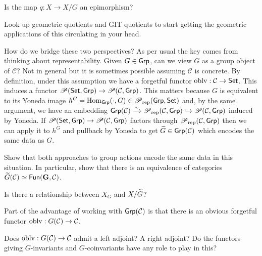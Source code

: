 \documentclass[11pt]{article}
\newcommand{\CC}{\mathcal{C}}
\begin{document}
\begin{exercise}
Is the map $q: X\to X/G$ an epimorphism?
\end{exercise}

\begin{exercise}
Look up geometric quotients and GIT quotients to start getting the geometric applications of this circulating in your head.
\end{exercise}

How do we bridge these two perspectives? As per usual the key comes from thinking about representability. Given $G\in\operatorname{\mathsf{Grp}}$, can we view $G$ as a group object of $\CC$? Not in general but it is sometimes possible assuming $\CC$ is concrete. By definition, under this assumption we have a forgetful functor $\oblv: \CC\to\Set$. This induces a functor $\Pre(\Set,\Grp)\to\Pre(\CC,\Grp)$. This matters because $G$ is equivalent to its Yoneda image $h^G=\operatorname{Hom}_{\operatorname{\mathsf{Grp}}}(\cdot,G)\in\operatorname{\mathscr{P}}_{\operatorname{rep}}(\operatorname{\mathsf{Grp}},\operatorname{\mathsf{Set}})$ and, by the same argument, we have an embedding $\Grp(\CC)\xto{\sim}\Pre_{\rep}(\CC,\Grp)\inj\Pre(\CC,\Grp)$ induced by Yoneda. If $\Pre(\Set,\Grp)\to\Pre(\CC,\Grp)$ factors through $\Pre_{\rep}(\CC,\Grp)$ then we can apply it to $h^G$ and pullback by Yoneda to get $\twid{G}\in\Grp(\CC)$ which encodes the same data as $G$.

\begin{exercise}
Show that both approaches to group actions encode the same data in this situation. In particular, show that there is an equivalence of categories $\twid{G}(\CC)\simeq\Fun(\mathbf{G},\CC)$.
\end{exercise}

\begin{exercise}
Is there a relationship between $X_G$ and $X/\widetilde{G}$?
\end{exercise}

Part of the advantage of working with $\Grp(\CC)$ is that there is an obvious forgetful functor $\oblv: G(\CC)\to\CC$. 

\begin{exercise}
Does $\oblv: G(\CC)\to\CC$ admit a left adjoint? A right adjoint? Do the functors giving $G$-invariants and $G$-coinvariants have any role to play in this?
\end{exercise}
\end{document}
